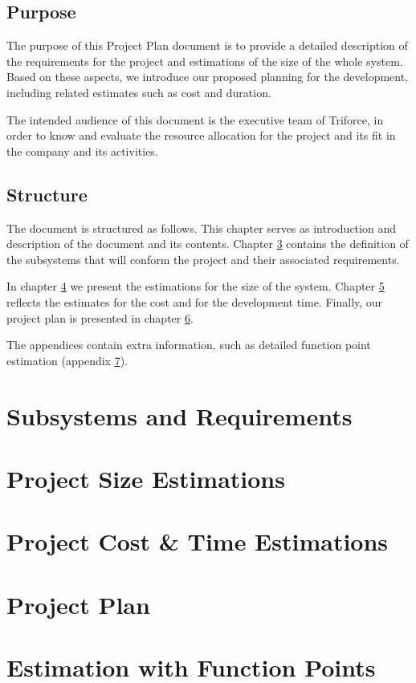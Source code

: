 \documentclass[11pt]{report}
\begin{document}
\section{Purpose}

The purpose of this Project Plan document is to provide a detailed description of the requirements for the project and estimations of the size of the whole system. Based on these aspects, we introduce our proposed planning for the development, including related estimates such as cost and duration.

The intended audience of this document is the executive team of Triforce, in order to know and evaluate the resource allocation for the project and its fit in the company and its activities.



\section{Structure}

The document is structured as follows. This chapter serves as introduction and description of the document and its contents. Chapter \ref{chapSubsystems} contains the definition of the subsystems that will conform the project and their associated requirements.

In chapter \ref{chapProjectSizeEstimations} we present the estimations for the size of the system. Chapter \ref{chapProjectCostTimeEstimationes} reflects the estimates for the cost and for the development time. Finally, our project plan is presented in chapter \ref{chapPlan}.

The appendices contain extra information, such as detailed function point estimation (appendix \ref{chapFunctionPoints}).

\chapter{Subsystems and Requirements}
\label{chapSubsystems}



\chapter{Project Size Estimations}
\label{chapProjectSizeEstimations}


\chapter{Project Cost \& Time Estimations}
\label{chapProjectCostTimeEstimationes}


\chapter{Project Plan}
\label{chapPlan}

\appendix

\chapter{Estimation with Function Points}
\label{chapFunctionPoints}

\end{document}
